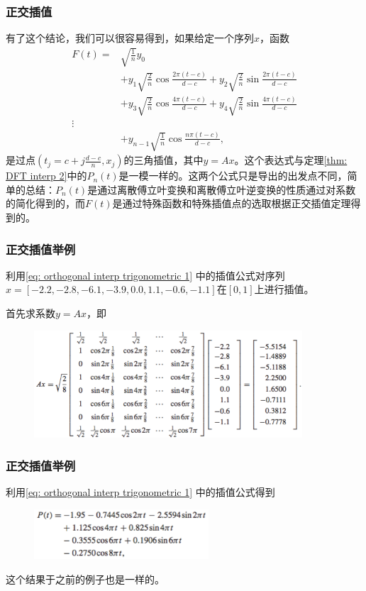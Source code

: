 \documentclass[10pt]{beamer}
\begin{document}
\begin{frame}
\frametitle{正交插值}
有了这个结论，我们可以很容易得到，如果给定一个序列$x$，函数
\begin{align}
\label{eq: orthogonal interp trigonometric 1} 
F(t) = &\sqrt{\frac{1}{n}} y_0 \nonumber \\
       &+ y_1 \sqrt{\frac{2}{n}}  \cos \frac{2 \pi (t-c)}{d-c} + y_2 \sqrt{\frac{2}{n}}  \sin \frac{2 \pi (t-c)}{d-c} \nonumber \\
       &+ y_3 \sqrt{\frac{2}{n}} \cos \frac{4 \pi (t-c)}{d-c} +y_4  \sqrt{\frac{2}{n}} \sin \frac{4 \pi (t-c)}{d-c} \nonumber \\
\vdots \nonumber \\
       &+ y_{n-1} \sqrt{\frac{1}{n}} \cos \frac{n \pi (t-c)}{d-c},
\end{align}
是过点$(t_j = c + j \frac{d-c}{n}, x_j)$的三角插值，其中$y = Ax$。这个表达式与定理\ref{thm: DFT interp 2}中的$P_n(t)$是一模一样的。这两个公式只是导出的出发点不同，简单的总结：$P_n(t)$是通过离散傅立叶变换和离散傅立叶逆变换的性质通过对系数的简化得到的，而$F(t)$是通过特殊函数和特殊插值点的选取根据正交插值定理得到的。
\end{frame}


\begin{frame}
\frametitle{正交插值举例}
\begin{example}
\label{example: orthogonal trigonometric interp 1}
利用\eqref{eq: orthogonal interp trigonometric 1} 中的插值公式对序列$x = [-2.2, -2.8, -6.1, -3.9, 0.0, 1.1, -0.6, -1.1]$在$[0,1]$上进行插值。
\end{example}
首先求系数$y = Ax$，即
\begin{figure}
\includegraphics[width=10cm]{figs/10-3-1_Orthogonal_Interp-2} 
\end{figure}
\end{frame}


\begin{frame}
\frametitle{正交插值举例}
利用\eqref{eq: orthogonal interp trigonometric 1} 中的插值公式得到
\begin{figure}
\includegraphics[width=6.5cm]{figs/10-3-1_Orthogonal_Interp-3} 
\end{figure}
这个结果于之前的例子也是一样的。
\end{frame}
\end{document}
